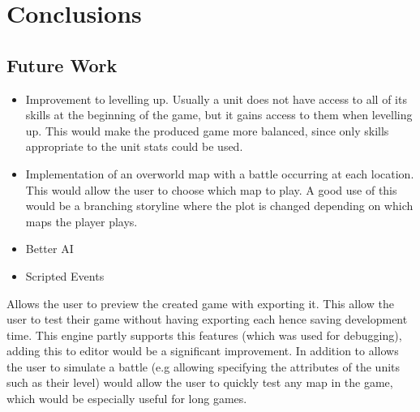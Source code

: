 \section{Conclusions}


\subsection{Future Work}
\begin{itemize}
\item Improvement to levelling up. 
	Usually a unit does not have access to all of its skills at the beginning of the game, but it gains access to them when levelling up.  This would make the produced game  more balanced, since only skills appropriate to the unit stats could be used.

\item Implementation of an overworld map with a battle occurring at each location. This would allow the user to choose which map to play.  A good use of this would be a branching storyline where the plot is changed depending on which maps the player plays.
 
\item  Better AI

\item Scripted Events


\end{itemize}

Allows the user to preview the created game with exporting it.  This allow the user to test their game without having exporting each hence saving development time.  This engine partly supports this features (which was used for debugging), adding this to editor would be a significant improvement. In addition to allows the user to simulate a battle (e.g allowing specifying the attributes of the units such as their level)  would allow the user to quickly test any map in the game, which would be especially useful for long games.

